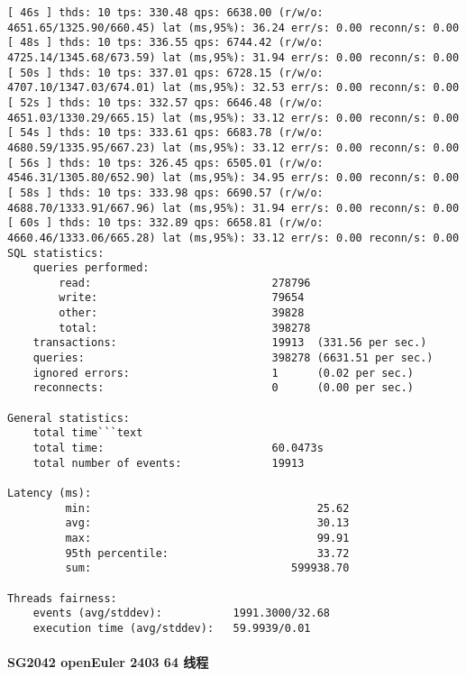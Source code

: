 \documentclass{article}
\begin{document}
\begin{verbatim}
[ 46s ] thds: 10 tps: 330.48 qps: 6638.00 (r/w/o: 4651.65/1325.90/660.45) lat (ms,95%): 36.24 err/s: 0.00 reconn/s: 0.00
[ 48s ] thds: 10 tps: 336.55 qps: 6744.42 (r/w/o: 4725.14/1345.68/673.59) lat (ms,95%): 31.94 err/s: 0.00 reconn/s: 0.00
[ 50s ] thds: 10 tps: 337.01 qps: 6728.15 (r/w/o: 4707.10/1347.03/674.01) lat (ms,95%): 32.53 err/s: 0.00 reconn/s: 0.00
[ 52s ] thds: 10 tps: 332.57 qps: 6646.48 (r/w/o: 4651.03/1330.29/665.15) lat (ms,95%): 33.12 err/s: 0.00 reconn/s: 0.00
[ 54s ] thds: 10 tps: 333.61 qps: 6683.78 (r/w/o: 4680.59/1335.95/667.23) lat (ms,95%): 33.12 err/s: 0.00 reconn/s: 0.00
[ 56s ] thds: 10 tps: 326.45 qps: 6505.01 (r/w/o: 4546.31/1305.80/652.90) lat (ms,95%): 34.95 err/s: 0.00 reconn/s: 0.00
[ 58s ] thds: 10 tps: 333.98 qps: 6690.57 (r/w/o: 4688.70/1333.91/667.96) lat (ms,95%): 31.94 err/s: 0.00 reconn/s: 0.00
[ 60s ] thds: 10 tps: 332.89 qps: 6658.81 (r/w/o: 4660.46/1333.06/665.28) lat (ms,95%): 33.12 err/s: 0.00 reconn/s: 0.00
SQL statistics:
    queries performed:
        read:                            278796
        write:                           79654
        other:                           39828
        total:                           398278
    transactions:                        19913  (331.56 per sec.)
    queries:                             398278 (6631.51 per sec.)
    ignored errors:                      1      (0.02 per sec.)
    reconnects:                          0      (0.00 per sec.)

General statistics:
    total time```text
    total time:                          60.0473s
    total number of events:              19913

Latency (ms):
         min:                                   25.62
         avg:                                   30.13
         max:                                   99.91
         95th percentile:                       33.72
         sum:                               599938.70

Threads fairness:
    events (avg/stddev):           1991.3000/32.68
    execution time (avg/stddev):   59.9939/0.01
\end{verbatim}

\paragraph{SG2042 openEuler 2403 64 线程}
\end{document}
